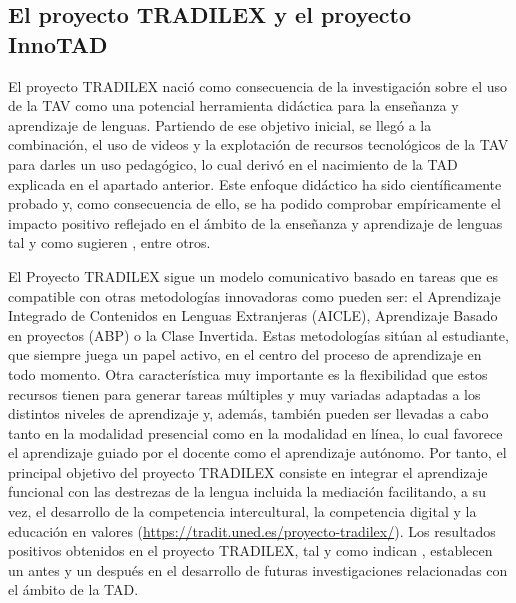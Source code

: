 \documentclass[spanish]{textolivre}
\begin{document}
\subsection{El proyecto TRADILEX y el proyecto InnoTAD}\label{sec-2.2}
El proyecto TRADILEX nació como consecuencia de la investigación sobre el uso de la TAV como una potencial herramienta didáctica para la enseñanza y aprendizaje de lenguas. Partiendo de ese objetivo inicial, se llegó a la combinación, el uso de videos y la explotación de recursos tecnológicos de la TAV para darles un uso pedagógico, lo cual derivó en el nacimiento de la TAD explicada en el apartado anterior. Este enfoque didáctico ha sido científicamente probado y, como consecuencia de ello, se ha podido comprobar empíricamente el impacto positivo reflejado en el ámbito de la enseñanza y aprendizaje de lenguas tal y como sugieren \textcite{fernandez-costales2023}, entre otros.

El Proyecto TRADILEX sigue un modelo comunicativo basado en tareas que es compatible con otras metodologías innovadoras como pueden ser: el Aprendizaje Integrado de Contenidos en Lenguas Extranjeras (AICLE), Aprendizaje Basado en proyectos (ABP) o la Clase Invertida. Estas metodologías sitúan al estudiante, que siempre juega un papel activo, en el centro del proceso de aprendizaje en todo momento. Otra característica muy importante es la flexibilidad que estos recursos tienen para generar tareas múltiples y muy variadas adaptadas a los distintos niveles de aprendizaje y, además, también pueden ser llevadas a cabo tanto en la modalidad presencial como en la modalidad en línea, lo cual favorece el aprendizaje guiado por el docente como el aprendizaje autónomo. Por tanto, el principal objetivo del proyecto TRADILEX consiste en integrar el aprendizaje funcional con las destrezas de la lengua incluida la mediación facilitando, a su vez, el desarrollo de la competencia intercultural, la competencia digital y la educación en valores (\url{https://tradit.uned.es/proyecto-tradilex/}). Los resultados positivos obtenidos en el proyecto TRADILEX, tal y como indican \textcite{fernandez-costales2023}, establecen un antes y un después en el desarrollo de futuras investigaciones relacionadas con el ámbito de la TAD.
\end{document}

